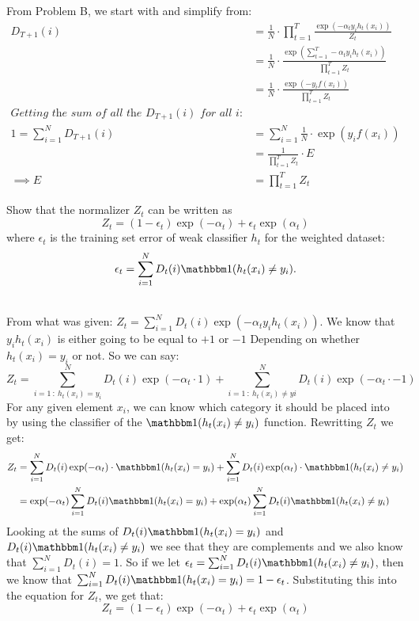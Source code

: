 \begin{solution}
    From Problem B, we start with and simplify from:
    \begin{align*}
        D_{T+1}(i) &= \frac{1}{N} \cdot \prod_{t = 1}^{T} \frac{\exp(-\alpha_{t}y_{i}h_{t}(x_i))}{Z_{t}} \\
        &= \frac{1}{N} \cdot \frac{\exp(\sum_{t=1}^{T}-\alpha_{t}y_{i}h_{t}(x_i))}{\prod_{t = 1}^{T}Z_{t}} \\
        &= \frac{1}{N} \cdot \frac{\exp(-y_{i}f(x_i))}{\prod_{t = 1}^{T}Z_{t}} \\
        \textit{Getting the sum of all the $D_{T+1}(i)$ for all i: } \\
        1 = \sum_{i=1}^{N} D_{T+1}(i) &= \sum_{i=1}^{N} \frac{1}{N} \cdot \exp(y_{i}f(x_i)) \\
        &= \frac{1}{\prod_{t = 1}^{T}Z_{t}} \cdot E \\
        \implies E &= \prod_{t = 1}^{T}Z_{t}
    \end{align*}

\end{solution}

\problem[5]
Show that the normalizer $Z_t$ can be written as
\[Z_t = (1 - \epsilon_t) \exp(-\alpha_t) + \epsilon_{t} \exp(\alpha_t)\]
where $\epsilon_t$ is the training set error of weak classifier $h_t$ for the weighted dataset:
\[\epsilon_t = \sum\limits_{i=1}^N D_t(i)\mathbbm1(h_t(x_i) \neq y_i).\]

\begin{solution}
    \\
    From what was given: $Z_{t} = \sum_{i=1}^{N} D_{t}(i)\exp(-\alpha_{t}y_{i}h_{t}(x_i))$. We know that $y_{i}h_{t}(x_i)$ is either going to be equal to $+1$ or $-1$ Depending on whether $h_{t}(x_i) = y_{i}$ or not. So we can say:
     $$Z_{t} = \sum_{i=1 \ : \ h_{t}(x_i) = y_{i}}^{N} D_{t}(i)\exp(-\alpha_{t} \cdot 1) + \sum_{i=1 \ : \ h_{t}(x_i) \neq y{i}}^{N} D_{t}(i)\exp(-\alpha_{t} \cdot -1)$$
     For any given element $x_i$, we can know which category it should be placed into by using the classifier of the $\mathbbm1(h_t(x_i) \neq y_i)$ function. Rewritting $Z_{t}$ we get:
    \begin{align*}
        Z_{t} &= \sum_{i = 1}^{N} D_{t}(i)\exp(-\alpha_{t})\cdot\mathbbm1(h_t(x_i) = y_i) + \sum_{i = 1}^{N} D_{t}(i)\exp(\alpha_{t})\cdot\mathbbm1(h_t(x_i) \neq y_i) \\
        &= \exp(-\alpha_{t})\sum_{i = 1}^{N} D_{t}(i)\mathbbm1(h_t(x_i) = y_i) + \exp(\alpha_{t})\sum_{i = 1}^{N} D_{t}(i)\mathbbm1(h_t(x_i) \neq y_i)
    \end{align*}
    Looking at the sums of $D_{t}(i)\mathbbm1(h_t(x_i) = y_i)$ and $D_{t}(i)\mathbbm1(h_t(x_i) \neq y_i)$ we see that they are complements and we also know that $\sum_{i = 1}^{N} D_{t}(i) = 1$. So if we let $\epsilon_{t} = \sum_{i = 1}^{N} D_{t}(i)\mathbbm1(h_t(x_i) \neq y_i)$, then we know that $\sum_{i = 1}^{N} D_{t}(i)\mathbbm1(h_t(x_i) = y_i) = 1 - \epsilon_{t}$. Substituting this into the equation for $Z_{t}$, we get that: $$Z_{t} = (1 - \epsilon_{t})\exp(-\alpha_{t}) + \epsilon_{t}\exp(\alpha_{t})$$ 
\end{solution}

